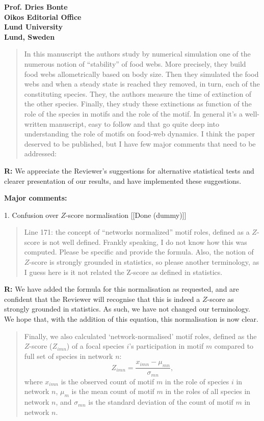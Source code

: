 \documentclass[12pt]{letter}
\begin{document}
\begin{letter}{\bf Prof. Dries Bonte\\
Oikos Editorial Office \\
Lund University \\
Lund, Sweden}
\begin{quotation}
    In this manuscript the authors study by numerical simulation one of the numerous notion of “stability” of food webs. More precisely, they build food webs allometrically based on body size. Then they simulated the food webs and when a steady state is reached they removed, in turn, each of the constituting species. They, the authors measure the time of extinction of the other species. Finally, they study these extinctions as function of the role of the species in motifs and the role of the motif. In general it’s a well-written manuscript, easy to follow and that go quite deep into understanding the role of motifs on food-web dynamics. I think the paper deserved to be published, but I have few major comments that need to be addressed:

  \end{quotation}

  \textbf{R:} We appreciate the Reviewer's suggestions for alternative statistical tests and clearer presentation of our results, and have implemented these suggestions.

  \smallskip

  \textbf{Major comments:}

    1. Confusion over $Z$-score normalisation [[Done (dummy)]]

      \begin{quotation}
        Line 171: the concept of “networks normalized” motif roles, defined as a $Z$-score is not well defined. Frankly speaking, I do not know how this was computed. Please be specific and provide the formula. Also, the notion of $Z$-score is strongly grounded in statistics, so please another terminology, as I guess here is it not related the Z-score as defined in statistics.
      \end{quotation}

      \smallskip

      \textbf{R:} We have added the formula for this normalisation as requested, and are confident that the Reviewer will recognise that this is indeed a $Z$-score as strongly grounded in statistics. As such, we have not changed our terminology. We hope that, with the addition of this equation, this normalisation is now clear.

      \begin{quotation}
        Finally, we also calculated `network-normalised' motif roles, defined as the $Z$-score ($Z_{imn}$) of a focal species $i$'s participation in motif $m$ compared to full set of species in network $n$:
        \begin{equation}
                Z_{imn} = \frac{x_{imn}-\mu_{mn}}{\sigma_{mn}} ,
        \end{equation}
        where $x_{imn}$ is the observed count of motif $m$ in the role of species $i$ in network $n$, $\mu_m$ is the mean count of motif $m$ in the roles of all species in network $n$, and $\sigma_{mn}$ is the standard deviation of the count of motif $m$ in network $n$.
      \end{quotation}


\end{letter}
\end{document}
